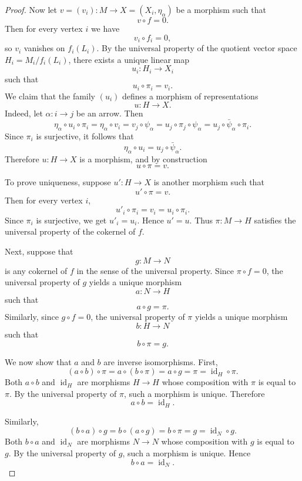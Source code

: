 \documentclass[11pt, a4paper]{article}
\begin{document}
\begin{enumerate}[leftmargin=*, label=\textbf{\arabic*.}]
\begin{proof}
    Now let $v=(v_i)\colon M\to X=(X_i,\eta_\alpha)$ be a morphism such that
    \[
    v\circ f=0.
    \]
    Then for every vertex $i$ we have
    \[
    v_i\circ f_i=0,
    \]
    so $v_i$ vanishes on $f_i(L_i)$. By the universal property of the quotient vector space $H_i=M_i/f_i(L_i)$, there exists a unique linear map
    \[
    u_i\colon H_i\to X_i
    \]
    such that
    \[
    u_i\circ \pi_i=v_i.
    \]
    We claim that the family $(u_i)$ defines a morphism of representations
    \[
    u\colon H\to X.
    \]
    Indeed, let $\alpha\colon i\to j$ be an arrow. Then
    \[
    \eta_\alpha\circ u_i\circ \pi_i
    =
    \eta_\alpha\circ v_i
    =
    v_j\circ \psi_\alpha
    =
    u_j\circ \pi_j\circ \psi_\alpha
    =
    u_j\circ \bar{\psi}_\alpha\circ \pi_i.
    \]
    Since $\pi_i$ is surjective, it follows that
    \[
    \eta_\alpha\circ u_i=u_j\circ \bar{\psi}_\alpha.
    \]
    Therefore $u\colon H\to X$ is a morphism, and by construction
    \[
    u\circ \pi=v.
    \]
    
    To prove uniqueness, suppose $u'\colon H\to X$ is another morphism such that
    \[
    u'\circ \pi=v.
    \]
    Then for every vertex $i$,
    \[
    u'_i\circ \pi_i=v_i=u_i\circ \pi_i.
    \]
    Since $\pi_i$ is surjective, we get $u'_i=u_i$. Hence $u'=u$. Thus $\pi\colon M\to H$ satisfies the universal property of the cokernel of $f$.
    
    Next, suppose that
    \[
    g\colon M\to N
    \]
    is any cokernel of $f$ in the sense of the universal property. Since $\pi\circ f=0$, the universal property of $g$ yields a unique morphism
    \[
    a\colon N\to H
    \]
    such that
    \[
    a\circ g=\pi.
    \]
    Similarly, since $g\circ f=0$, the universal property of $\pi$ yields a unique morphism
    \[
    b\colon H\to N
    \]
    such that
    \[
    b\circ \pi=g.
    \]
    
    We now show that $a$ and $b$ are inverse isomorphisms. First,
    \[
    (a\circ b)\circ \pi
    =
    a\circ (b\circ \pi)
    =
    a\circ g
    =
    \pi
    =
    \operatorname{id}_H\circ \pi.
    \]
    Both $a\circ b$ and $\operatorname{id}_H$ are morphisms $H\to H$ whose composition with $\pi$ is equal to $\pi$. By the universal property of $\pi$, such a morphism is unique. Therefore
    \[
    a\circ b=\operatorname{id}_H.
    \]
    
    Similarly,
    \[
    (b\circ a)\circ g
    =
    b\circ (a\circ g)
    =
    b\circ \pi
    =
    g
    =
    \operatorname{id}_N\circ g.
    \]
    Both $b\circ a$ and $\operatorname{id}_N$ are morphisms $N\to N$ whose composition with $g$ is equal to $g$. By the universal property of $g$, such a morphism is unique. Hence
    \[
    b\circ a=\operatorname{id}_N.
    \]
    

\end{proof}
\end{enumerate}
\end{document}

